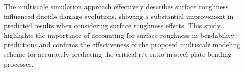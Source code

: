 The multiscale simulation approach effectively describes surface roughness influenced ductile damage evolutions, showing a substantial improvement in predicted results when considering surface roughness effects. This study highlights the importance of accounting for surface roughness in bendability predictions and confirms the effectiveness of the proposed multiscale modeling scheme for accurately predicting the critical r/t ratio in steel plate bending processes.